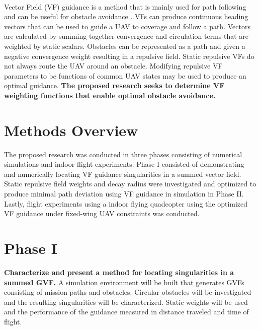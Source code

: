 \documentclass[numbered,pdftex]{ohio-etd}
\begin{document}
\\
Vector Field (VF) guidance is a method that is mainly used for path following and can be useful for obstacle avoidance \cite{wwc,panagou_motion_2014}. VFs can produce continuous heading vectors that can be used to guide a UAV to coverage and follow a path. Vectors are calculated by summing together convergence and circulation terms that are weighted by static scalars. Obstacles can be represented as a path and given a negative convergence weight resulting in a repulsive field. Static repulsive VFs do not always route the UAV around an obstacle. Modifying repulsive VF parameters to be functions of common UAV states may be used to produce an optimal guidance. \textbf{The proposed research seeks to determine VF weighting functions that enable optimal obstacle avoidance.}



 \pagebreak
 
 \section{Methods Overview}
 
 The proposed research was conducted in three phases consisting of numerical simulations and indoor flight experiments. Phase I consisted of demonstrating and numerically locating VF guidance singularities in a summed vector field. Static repulsive field weights and decay radius were investigated and optimized to produce minimal path deviation using VF guidance in simulation in Phase II. Lastly, flight experiments using a indoor flying quadcopter using the optimized VF guidance under fixed-wing UAV constraints was conducted. 
 
% 

 \section{Phase I}
 \textbf{Characterize and present a method for locating singularities in a summed GVF.} A simulation environment will be built that generates GVFs consisting of mission paths and obstacles. Circular obstacles will be investigated and the resulting singularities will be characterized. Static weights will be used and the performance of the guidance measured in distance traveled and time of flight. 
 
\end{document}
